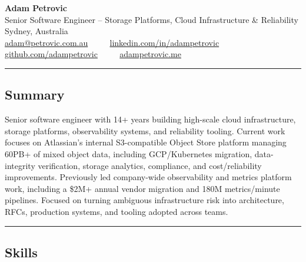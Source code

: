 \documentclass[11pt,letterpaper]{article}
\newcommand{\accentrule}{{\color{accent}\hrule}}
\newcommand{\accenticon}[1]{\textcolor{accent}{#1}}
\begin{document}
\begin{center}
        {\LARGE \textbf{\textcolor{accent}{Adam Petrovic}}}\\
        \vspace{0.10cm}
        Senior Software Engineer -- Storage Platforms, Cloud Infrastructure \& Reliability
        \vspace{0.20cm}
        \\
        Sydney, Australia
        \vspace{0.20cm}
        \\
        \raisebox{-0.1\height}{\Large \accenticon{\faEnvelopeSquare}} \href{mailto:adam@petrovic.com.au}{adam@petrovic.com.au} \ \ \ \ \raisebox{-0.1\height}{\Large \accenticon{\faLinkedinSquare}} \href{https://linkedin.com/in/adampetrovic}{linkedin.com/in/adampetrovic}\\
        \vspace{0.10cm}
        \raisebox{-0.1\height}{\Large \accenticon{\faGithubSquare}} \href{https://github.com/adampetrovic}{github.com/adampetrovic} \ \ \ \ \raisebox{-0.1\height}{\Large \accenticon{\faGlobe}} \href{https://adampetrovic.me}{adampetrovic.me}
\end{center}

\accentrule
\vspace{-1em}
\subsection*{\Large \textcolor{accent}{Summary}}

Senior software engineer with 14+ years building high-scale cloud infrastructure, storage platforms, observability systems, and reliability tooling. Current work focuses on Atlassian's internal S3-compatible Object Store platform managing 60PB+ of mixed object data, including GCP/Kubernetes migration, data-integrity verification, storage analytics, compliance, and cost/reliability improvements. Previously led company-wide observability and metrics platform work, including a \$2M+ annual vendor migration and 180M metrics/minute pipelines. Focused on turning ambiguous infrastructure risk into architecture, RFCs, production systems, and tooling adopted across teams.

\vspace{0.45em}
\accentrule
\vspace{-1em}
\subsection*{\Large \textcolor{accent}{Skills}}
\end{document}
